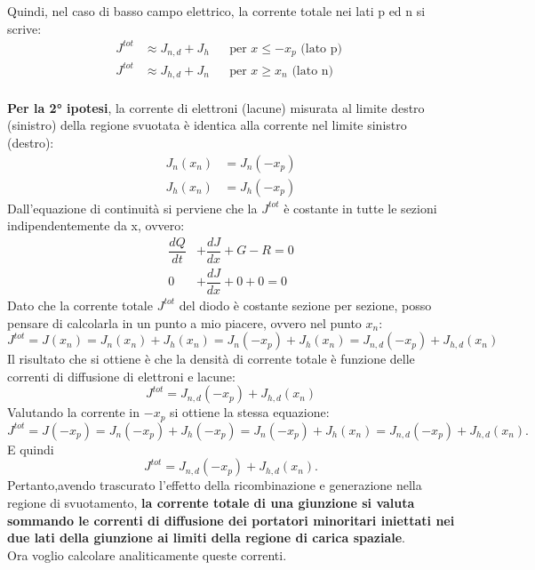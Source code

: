 Quindi, nel  caso di basso campo elettrico, la corrente totale nei lati p ed n si scrive:
\begin{align*}
    J^{tot} &\approx J_{n,d} + J_h &&\text{per } x \leq -x_p \text{ (lato p) }\\
    J^{tot} &\approx J_{h,d} + J_n &&\text{per } x \geq x_n \text{ (lato n) }
\end{align*}\\
\textbf{Per la 2° ipotesi}, la corrente di elettroni (lacune) misurata al limite destro (sinistro) della regione svuotata è identica alla corrente nel limite sinistro (destro):
\begin{align*}
    J_n(x_n)&=J_n(-x_p)\\
    J_h(x_n) &=J_h(-x_p)
\end{align*}
Dall'equazione di continuità si perviene che la $J^{tot}$ è costante in tutte le sezioni indipendentemente da x, ovvero:
\begin{align*}
    \dfrac{dQ}{dt} &+\dfrac{dJ}{dx}+G-R=0 \\
    0              &+\dfrac{dJ}{dx}+0+0=0 
\end{align*}
Dato che la corrente totale $J^{tot}$ del diodo è costante sezione per sezione, posso pensare di calcolarla in un punto a mio piacere, ovvero nel punto $x_n$:
\begin{equation*}
    J^{tot}=J(x_n)=J_n(x_n)+J_h(x_n)=J_n(-x_p)+J_h(x_n)=J_{n,d}(-x_p)+J_{h,d}(x_n)
\end{equation*}
Il risultato che si ottiene è che la densità di corrente totale è funzione delle correnti di diffusione di elettroni e lacune:
\begin{equation}
    J^{tot}=J_{n,d}(-x_p)+J_{h,d}(x_n)
\end{equation}
Valutando la corrente in $-x_p$ si ottiene la stessa equazione:
\begin{equation*}
    J^{tot}=J(-x_p)=J_n(-x_p)+J_h(-x_p)=J_n(-x_p)+J_h(x_n)=J_{n,d}(-x_p)+J_{h,d}(x_n).
\end{equation*}
E quindi
\begin{equation*}
    J^{tot}=J_{n,d}(-x_p)+J_{h,d}(x_n).
\end{equation*}
Pertanto,avendo trascurato l'effetto della ricombinazione e generazione nella regione di svuotamento, \textbf{la corrente totale di una giunzione si valuta sommando le correnti di diffusione dei portatori minoritari iniettati nei due lati della giunzione ai limiti della regione di carica spaziale}.\\
%
Ora voglio calcolare analiticamente queste correnti.
